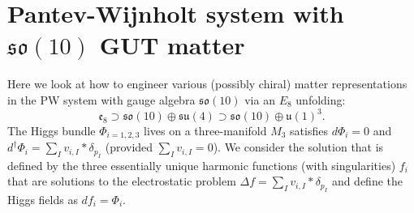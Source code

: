 \documentclass[12pt]{article}%
\numberwithin{equation}{section}
\renewcommand{\(}{\left(}
\renewcommand{\)}{\right)}
\renewcommand{\[}{\left[}
\renewcommand{\]}{\right]}
\begin{document}
\section{Pantev-Wijnholt system with $\mathfrak{so}(10)$ GUT matter}\label{app:SO10PW}


Here we look at how to engineer various (possibly chiral) matter representations in the PW system with gauge algebra $\mathfrak{so}(10)$ via an $E_8$ unfolding:
\begin{equation}
\mathfrak{e}_8  \supset \mathfrak{so}(10) \oplus \mathfrak{su}(4) \supset \mathfrak{so}(10)\oplus \mathfrak{u}(1)^3.
\end{equation}
The Higgs bundle $\Phi_{i=1,2,3}$ lives on a three-manifold $M_3$ satisfies $d\Phi_i=0$ and $d^\dagger\Phi_i=\sum_I v_{i,I} *\delta_{p_I}$ (provided $\sum_Iv_{i,I}=0$). We consider the solution that is defined by the three essentially unique harmonic functions (with singularities) $f_i$ that are solutions to the electrostatic problem $\Delta f=\sum_I v_{i,I} *\delta_{p_I}$ and define the Higgs fields as $df_i=\Phi_i$.
\end{document}
